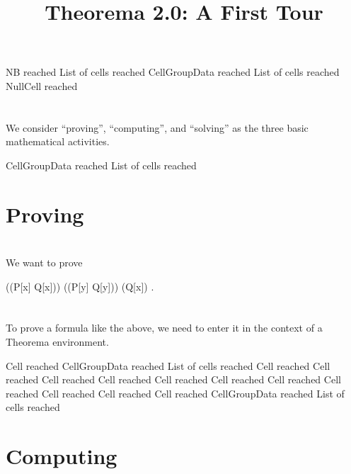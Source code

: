 \documentclass{article}
\newcommand{\light}[1]{{\color{lightgray}#1}}
\newcommand{\IffTM}[2]{#1 \leftrightarrow #2}
\newcommand{\AndTM}[2]{#1 \wedge #2}
\newcommand{\ForallTM}[2]{\forall_{#1} #2}
\newcommand{\RNG}[1]{#1}
\newcommand{\SIMPRNG}[1]{\left( #1 \right)}
\newcommand{\VarTM}[1]{\mathit{#1}}
\newcommand{\OrTM}[2]{#1 \vee #2}
\newcommand{\PredicateTM}[2]{\textit{#1}\left(#2\right)} %
\begin{document}
% 

\title{Theorema 2.0: A First Tour}
\author{}
\date{}
\maketitle

\light{NB reached} \light{List of cells reached} \light{CellGroupData reached} \light{List of cells reached} Null\light{Cell reached} \begingroup \section*{} We consider “proving”, “computing”, and “solving” as the three basic mathematical activities.\endgroup 

\light{CellGroupData reached} \light{List of cells reached} \section{Proving}

\begingroup \section*{} We want to prove\endgroup 

\begin{center}((P[x] \lor Q[x])) \land ((P[y] \Rightarrow Q[y])) \Leftrightarrow (Q[x]) .\end{center}
\begingroup \section*{} To prove a formula like the above, we need to enter it in the context of a Theorema environment.\endgroup 

\begin{openenvironment}
\end{openenvironment}
\light{Cell reached} \light{CellGroupData reached} \light{List of cells reached} \light{Cell reached} \light{Cell reached} \light{Cell reached} \light{Cell reached} \light{Cell reached} \light{Cell reached} \light{Cell reached} \light{Cell reached} \light{Cell reached} \light{Cell reached} \light{Cell reached} \light{CellGroupData reached} \light{List of cells reached} \section{Computing}
\end{document}
